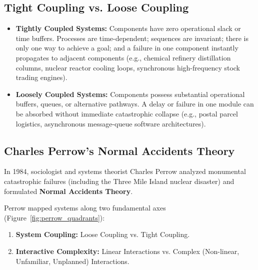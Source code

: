 \subsection{Tight Coupling vs. Loose Coupling}
\begin{itemize}[leftmargin=1.5em]
    \item \textbf{Tightly Coupled Systems:} Components have zero operational slack or time buffers. Processes are time-dependent; sequences are invariant; there is only one way to achieve a goal; and a failure in one component instantly propagates to adjacent components (e.g., chemical refinery distillation columns, nuclear reactor cooling loops, synchronous high-frequency stock trading engines).
    \item \textbf{Loosely Coupled Systems:} Components possess substantial operational buffers, queues, or alternative pathways. A delay or failure in one module can be absorbed without immediate catastrophic collapse (e.g., postal parcel logistics, asynchronous message-queue software architectures).
\end{itemize}

\subsection{Charles Perrow's Normal Accidents Theory}
In 1984, sociologist and systems theorist Charles Perrow analyzed monumental catastrophic failures (including the Three Mile Island nuclear disaster) and formulated \textbf{Normal Accidents Theory}.

Perrow mapped systems along two fundamental axes (Figure~\ref{fig:perrow_quadrants}):
\begin{enumerate}[label=(\alph*), itemsep=2pt]
    \item \textbf{System Coupling:} Loose Coupling vs. Tight Coupling.
    \item \textbf{Interactive Complexity:} Linear Interactions vs. Complex (Non-linear, Unfamiliar, Unplanned) Interactions.
\end{enumerate}

